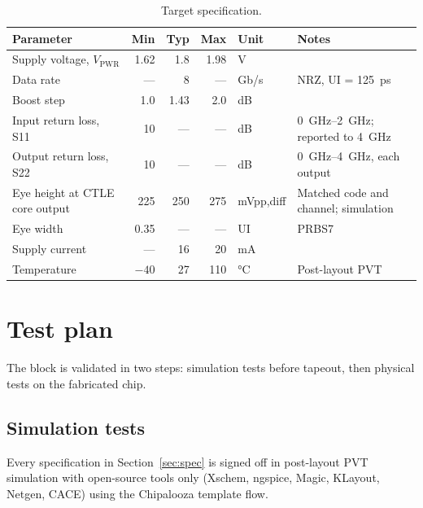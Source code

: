 \documentclass[11pt,a4paper]{article}
\begin{document}
\begin{table}[h]
\centering\small
\caption{Target specification.}
\label{tab:spec}
\begin{tabularx}{\linewidth}{@{}L r r r l L@{}}
\toprule
Parameter & Min & Typ & Max & Unit & Notes \\
\midrule
Supply voltage, $V_\mathrm{PWR}$ & 1.62 & 1.8 & 1.98 & V & \\
Data rate & --- & 8 & --- & Gb/s & NRZ, UI = \SI{125}{ps} \\
Boost step & 1.0 & 1.43 & 2.0 & dB & \\
Input return loss, S11 & 10 & --- & --- & dB & \SIrange{0}{2}{GHz}; reported to \SI{4}{GHz} \\
Output return loss, S22 & 10 & --- & --- & dB & \SIrange{0}{4}{GHz}, each output \\
Eye height at CTLE core output & 225 & 250 & 275 & mVpp,diff & Matched code and channel; simulation \\
Eye width & 0.35 & --- & --- & UI & PRBS7 \\
Supply current & --- & 16 & 20 & mA & \\
Temperature & $-40$ & 27 & 110 & \si{\celsius} & Post-layout PVT \\
\bottomrule
\end{tabularx}
\end{table}

\section{Test plan}

The block is validated in two steps: simulation tests before tapeout, then
physical tests on the fabricated chip.

\subsection{Simulation tests}

Every specification in Section~\ref{sec:spec} is signed off in post-layout
PVT simulation with open-source tools only (Xschem, ngspice, Magic, KLayout,
Netgen, CACE) using the Chipalooza template flow.
\end{document}
